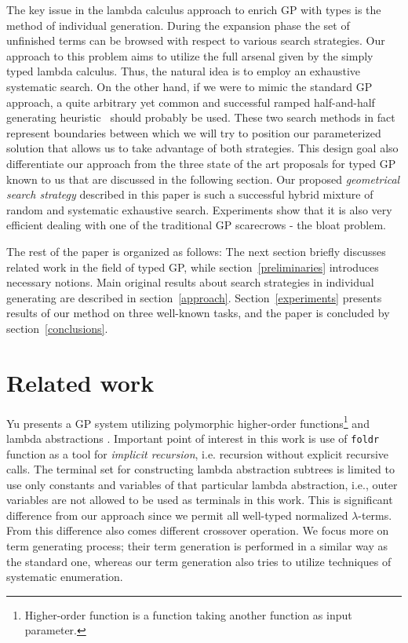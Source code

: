 \documentclass[conference]{IEEEtran}
\newcommand{\lterms}{$\lambda$-terms\xspace}
\begin{document}
The key issue in the lambda calculus approach to enrich GP with types is the method of individual generation. During the expansion phase the set of unfinished terms can be browsed with respect to various search strategies. Our approach to this problem aims to utilize the full arsenal given by the simply typed lambda calculus. Thus, the natural idea is to employ an exhaustive systematic search. On the other hand, if we were to mimic the standard GP approach, a quite arbitrary yet common and successful ramped half-and-half generating heuristic~\cite{fg} should probably be used.  
These two search methods in fact represent boundaries between which we will try to position our parameterized solution that allows us to take advantage of both strategies. This design goal also differentiate our approach from 
the three state of the art proposals for typed GP known to us that are discussed in the following section. 
Our proposed \emph{geometrical search strategy} described in this paper is such a successful hybrid mixture of random and systematic exhaustive search. Experiments show that it is also very efficient dealing with one of the traditional GP scarecrows - the bloat problem.

The rest of the paper is organized as follows: The next section briefly discusses related work in the field of typed GP, while section~\ref{preliminaries} introduces necessary notions. Main original results about search strategies in individual generating are described in section~\ref{approach}. Section~\ref{experiments} presents results of our method on three well-known tasks, and the paper is concluded by section~\ref{conclusions}.

\section{Related work}
\label{related}

Yu presents a GP system utilizing
polymorphic higher-order functions\footnote{Higher-order 
function is a function taking another function as 
input parameter.} and lambda abstractions  \cite{yu01}.
Important point of interest in this work is use of
\texttt{foldr} function as a tool for \textit{implicit recursion},
i.e. recursion without explicit recursive calls. 
The terminal set for constructing lambda abstraction subtrees 
is limited to use only constants and variables of that particular
lambda abstraction, i.e., outer variables are not allowed to be used
as terminals in this work. This is significant difference from our approach 
since we permit all well-typed normalized \lterms. From this difference also
comes different crossover operation. We focus more on term generating process; 
their term generation is performed in a similar way as the standard one, 
whereas our term generation also tries to utilize techniques of systematic enumeration. 
\end{document}
